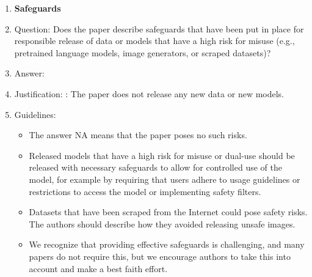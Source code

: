 \documentclass{article}
\begin{document}
\begin{enumerate}
\item {\bf Safeguards}
    \item[] Question: Does the paper describe safeguards that have been put in place for responsible release of data or models that have a high risk for misuse (e.g., pretrained language models, image generators, or scraped datasets)?
    \item[] Answer: \answerNA{} %
    \item[] Justification: : The paper does not release any new data or new models.
    \item[] Guidelines:
    \begin{itemize}
        \item The answer NA means that the paper poses no such risks.
        \item Released models that have a high risk for misuse or dual-use should be released with necessary safeguards to allow for controlled use of the model, for example by requiring that users adhere to usage guidelines or restrictions to access the model or implementing safety filters.
        \item Datasets that have been scraped from the Internet could pose safety risks. The authors should describe how they avoided releasing unsafe images.
        \item We recognize that providing effective safeguards is challenging, and many papers do not require this, but we encourage authors to take this into account and make a best faith effort.
    \end{itemize}


\end{enumerate}
\end{document}
